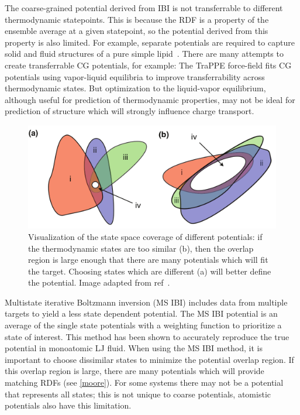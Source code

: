 The coarse-grained potential derived from IBI is not transferrable to different thermodynamic statepoints.
This is because the RDF is a property of the ensemble average at a given statepoint, so the potential derived from this property is also limited.
For example, separate potentials are required to capture solid and fluid structures of a pure simple lipid~\cite{Hadley2010a}.
There are many attempts to create transferrable CG potentials, for example:
The TraPPE force-field fits CG potentials using vapor-liquid equilibria to improve transferrability across thermodynamic states\cite{Maerzke2011}.
But optimization to the liquid-vapor equilibrium, although useful for prediction of thermodynamic properties, may not be ideal for prediction of structure which will strongly influence charge transport.

\begin{figure}
    \centering
    \includegraphics[width=\linewidth]{images/moorefig.pdf}
    \caption{Visualization of the state space coverage of different potentials: if the thermodynamic states are too similar (b), then the overlap region is large enough that there are many potentials which will fit the target. Choosing states which are different (a) will better define the potential. Image adapted from ref~\cite{Moore2014}.}\label{moore}
\end{figure}

Multistate iterative Boltzmann inversion (MS IBI) includes data from multiple targets to yield a less state dependent potential\cite{Moore2014}.
The MS IBI potential is an average of the single state potentials with a weighting function to prioritize a state of interest.
This method has been shown to accurately reproduce the true potential in monoatomic LJ fluid.
When using the MS IBI method, it is important to choose dissimilar states to minimize the potential overlap region.
If this overlap region is large, there are many potentials which will provide matching RDFs (see \autoref{moore}).
For some systems there may not be a potential that represents all states; this is not unique to coarse potentials, atomistic potentials also have this limitation. 

